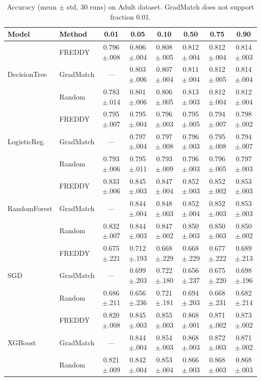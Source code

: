 \documentclass{article}
\begin{document}
\begin{table}[h]
\centering
\caption{Accuracy (mean $\pm$ std, 30 runs) on Adult dataset. GradMatch does not support fraction 0.01.}
\label{tab:acc-adult}
\small
\begin{tabular}{llcccccc}
\toprule
\textbf{Model} & \textbf{Method} & \textbf{0.01} & \textbf{0.05} & \textbf{0.10} & \textbf{0.50} & \textbf{0.75} & \textbf{0.90} \\
\midrule
\multirow{3}{*}{DecisionTree}
  & FREDDY    & 0.796$\pm$.008 & 0.806$\pm$.004 & 0.808$\pm$.005 & 0.812$\pm$.004 & 0.812$\pm$.004 & 0.814$\pm$.003 \\
  & GradMatch & ---            & 0.803$\pm$.006 & 0.807$\pm$.004 & 0.811$\pm$.004 & 0.812$\pm$.005 & 0.814$\pm$.004 \\
  & Random    & 0.783$\pm$.014 & 0.801$\pm$.006 & 0.806$\pm$.005 & 0.813$\pm$.003 & 0.812$\pm$.004 & 0.812$\pm$.004 \\
\midrule
\multirow{3}{*}{LogisticReg.}
  & FREDDY    & 0.795$\pm$.007 & 0.795$\pm$.004 & 0.796$\pm$.003 & 0.795$\pm$.005 & 0.794$\pm$.007 & 0.798$\pm$.002 \\
  & GradMatch & ---            & 0.797$\pm$.004 & 0.797$\pm$.008 & 0.796$\pm$.003 & 0.795$\pm$.008 & 0.794$\pm$.007 \\
  & Random    & 0.793$\pm$.006 & 0.795$\pm$.011 & 0.793$\pm$.009 & 0.796$\pm$.003 & 0.796$\pm$.005 & 0.797$\pm$.003 \\
\midrule
\multirow{3}{*}{RandomForest}
  & FREDDY    & 0.833$\pm$.006 & 0.845$\pm$.003 & 0.847$\pm$.004 & 0.852$\pm$.003 & 0.852$\pm$.002 & 0.853$\pm$.003 \\
  & GradMatch & ---            & 0.844$\pm$.004 & 0.848$\pm$.003 & 0.852$\pm$.004 & 0.852$\pm$.003 & 0.853$\pm$.003 \\
  & Random    & 0.832$\pm$.007 & 0.844$\pm$.003 & 0.847$\pm$.002 & 0.850$\pm$.003 & 0.850$\pm$.003 & 0.850$\pm$.002 \\
\midrule
\multirow{3}{*}{SGD}
  & FREDDY    & 0.675$\pm$.221 & 0.712$\pm$.193 & 0.668$\pm$.229 & 0.668$\pm$.229 & 0.677$\pm$.222 & 0.689$\pm$.213 \\
  & GradMatch & ---            & 0.699$\pm$.203 & 0.722$\pm$.180 & 0.656$\pm$.237 & 0.675$\pm$.220 & 0.698$\pm$.196 \\
  & Random    & 0.686$\pm$.211 & 0.656$\pm$.236 & 0.721$\pm$.181 & 0.694$\pm$.203 & 0.668$\pm$.231 & 0.682$\pm$.214 \\
\midrule
\multirow{3}{*}{XGBoost}
  & FREDDY    & 0.820$\pm$.008 & 0.845$\pm$.003 & 0.855$\pm$.003 & 0.868$\pm$.001 & 0.871$\pm$.002 & 0.873$\pm$.002 \\
  & GradMatch & ---            & 0.844$\pm$.004 & 0.854$\pm$.003 & 0.868$\pm$.003 & 0.872$\pm$.003 & 0.871$\pm$.002 \\
  & Random    & 0.821$\pm$.009 & 0.842$\pm$.004 & 0.853$\pm$.004 & 0.866$\pm$.003 & 0.868$\pm$.003 & 0.868$\pm$.003 \\
\bottomrule
\end{tabular}
\end{table}
\end{document}
